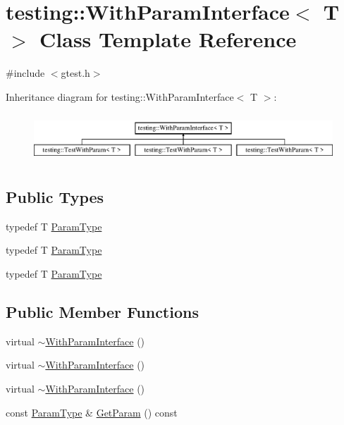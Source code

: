 \hypertarget{classtesting_1_1_with_param_interface}{}\section{testing\+::With\+Param\+Interface$<$ T $>$ Class Template Reference}
\label{classtesting_1_1_with_param_interface}


{\ttfamily \#include $<$gtest.\+h$>$}

Inheritance diagram for testing\+::With\+Param\+Interface$<$ T $>$\+:\begin{figure}[H]
\begin{center}
\leavevmode
\includegraphics[height=1.839080cm]{d9/dd7/classtesting_1_1_with_param_interface}
\end{center}
\end{figure}
\subsection*{Public Types}
\begin{DoxyCompactItemize}
\item 
typedef T \mbox{\hyperlink{classtesting_1_1_with_param_interface_a343febaaebf1f025bda484f841d4fec1}{Param\+Type}}
\item 
typedef T \mbox{\hyperlink{classtesting_1_1_with_param_interface_a343febaaebf1f025bda484f841d4fec1}{Param\+Type}}
\item 
typedef T \mbox{\hyperlink{classtesting_1_1_with_param_interface_a343febaaebf1f025bda484f841d4fec1}{Param\+Type}}
\end{DoxyCompactItemize}
\subsection*{Public Member Functions}
\begin{DoxyCompactItemize}
\item 
virtual \mbox{\hyperlink{classtesting_1_1_with_param_interface_a4e170bd42fa5e8ce48b80cee6bb52e26}{$\sim$\+With\+Param\+Interface}} ()
\item 
virtual \mbox{\hyperlink{classtesting_1_1_with_param_interface_a4e170bd42fa5e8ce48b80cee6bb52e26}{$\sim$\+With\+Param\+Interface}} ()
\item 
virtual \mbox{\hyperlink{classtesting_1_1_with_param_interface_a4e170bd42fa5e8ce48b80cee6bb52e26}{$\sim$\+With\+Param\+Interface}} ()
\item 
const \mbox{\hyperlink{classtesting_1_1_with_param_interface_a343febaaebf1f025bda484f841d4fec1}{Param\+Type}} \& \mbox{\hyperlink{classtesting_1_1_with_param_interface_aa7b9028f06ee7ec1174bb25317b07eb2}{Get\+Param}} () const
\end{DoxyCompactItemize}
